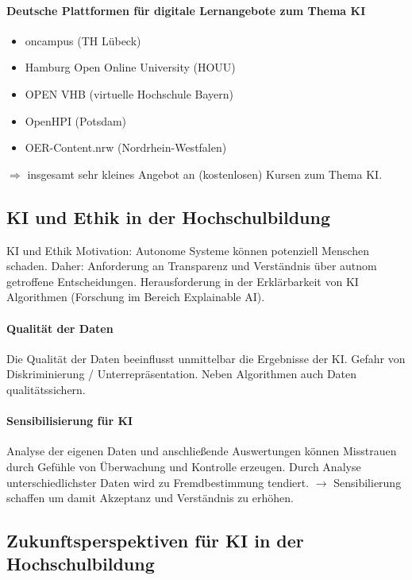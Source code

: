 \paragraph*{Deutsche Plattformen für digitale Lernangebote zum Thema KI}
\begin{itemize}
    \item oncampus (TH Lübeck)
    \item Hamburg Open Online University (HOUU)
    \item OPEN VHB (virtuelle Hochschule Bayern)
    \item OpenHPI (Potsdam)
    \item OER-Content.nrw (Nordrhein-Westfalen)
\end{itemize}
$\Rightarrow$ insgesamt sehr kleines Angebot an (kostenlosen) Kursen zum Thema KI.

\subsection{KI und Ethik in der Hochschulbildung}
KI und Ethik Motivation: Autonome Systeme können potenziell Menschen schaden. Daher: Anforderung an Transparenz und Verständnis über autnom getroffene Entscheidungen. Herausforderung in der Erklärbarkeit von KI Algorithmen (Forschung im Bereich \glqq Explainable AI\grqq{}).

\paragraph*{Qualität der Daten} Die Qualität der Daten beeinflusst unmittelbar die Ergebnisse der KI. Gefahr von Diskriminierung / Unterrepräsentation. Neben Algorithmen auch Daten qualitätssichern.

\paragraph*{Sensibilisierung für KI} Analyse der eigenen Daten und anschließende Auswertungen können Misstrauen durch Gefühle von Überwachung und Kontrolle erzeugen. Durch Analyse unterschiedlichster Daten wird zu Fremdbestimmung tendiert. $\rightarrow$ Sensibilierung schaffen um damit Akzeptanz und Verständnis zu erhöhen.

\subsection{Zukunftsperspektiven für KI in der Hochschulbildung}

